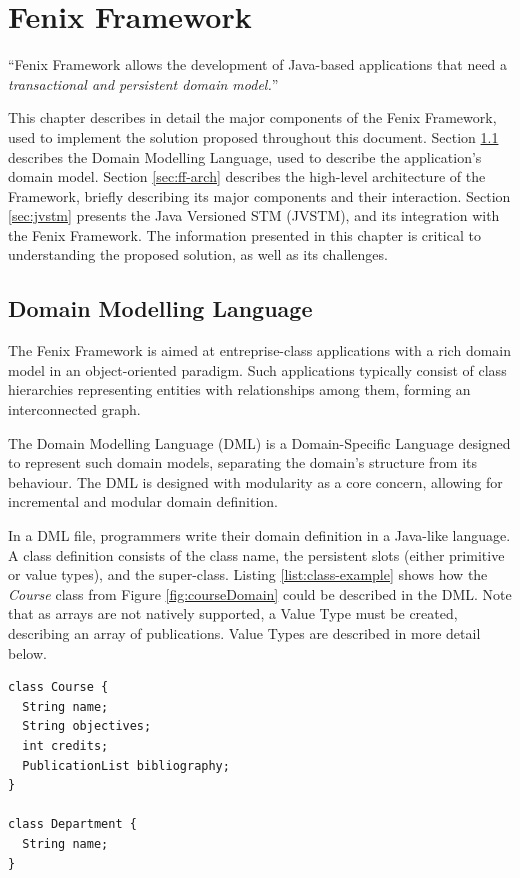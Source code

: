 \chapter{Fenix Framework}
\label{chap:ff}

``Fenix Framework allows the development of Java-based applications
that need a {\it transactional and persistent domain model.}''

This chapter describes in detail the major components of the Fenix
Framework, used to implement the solution proposed throughout this
document. Section \ref{sec:dml} describes the Domain Modelling
Language, used to describe the application's domain model. Section
\ref{sec:ff-arch} describes the high-level architecture of the
Framework, briefly describing its major components and their
interaction. Section \ref{sec:jvstm} presents the Java Versioned STM
(JVSTM), and its integration with the Fenix Framework. The information
presented in this chapter is critical to understanding the proposed
solution, as well as its challenges.

\section{Domain Modelling Language}
\label{sec:dml}

The Fenix Framework is aimed at entreprise-class applications with a
rich domain model in an object-oriented paradigm. Such applications
typically consist of class hierarchies representing entities with
relationships among them, forming an interconnected graph. 

The Domain Modelling Language (DML) is a Domain-Specific Language
designed to represent such domain models, separating the domain's
structure from its behaviour. The DML is designed with modularity as a
core concern, allowing for incremental and modular domain definition.

In a DML file, programmers write their domain definition in a
Java-like language. A class definition consists of the class name, the
persistent slots (either primitive or value types), and the
super-class. Listing \ref{list:class-example} shows how the {\it
  Course} class from Figure \ref{fig:courseDomain} could be described
in the DML. Note that as arrays are not natively supported, a Value
Type must be created, describing an array of publications. Value Types
are described in more detail below.

\begin{lstlisting}[caption={DML for the {\it Course} and {\it
      Department} classes},
  label={list:class-example}]
class Course {
  String name;
  String objectives;
  int credits;
  PublicationList bibliography;
}

class Department {
  String name;
}
\end{lstlisting}

